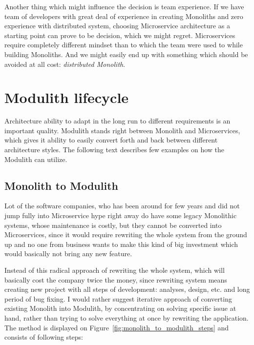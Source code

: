 Another thing which might influence the decision is team experience. If we have team of developers with great deal of experience in creating Monoliths and zero experience with distributed system, choosing Microservice architecture as a starting point can prove to be decision, which we might regret. Microservices require completely different mindset than to which the team were used to while building Monoliths. And we might easily end up with something which should be avoided at all cost: \textit{distributed Monolith}.

\section{Modulith lifecycle}
Architecture ability to adapt in the long run to different requirements is an important quality. Modulith stands right between Monolith and Microservices, which gives it ability to easily convert forth and back between different architecture styles. The following text describes few examples on how the Modulith can utilize.

\subsection{Monolith to Modulith}
\label{subsection:monolith_to_modulith}
Lot of the software companies, who has been around for few years and did not jump fully into Microservice hype right away do have some legacy Monolithic systems, whose maintenance is costly, but they cannot be converted into Microservices, since it would require rewriting the whole system from the ground up and no one from business wants to make this kind of big investment which would basically not bring any new feature.

Instead of this radical approach of rewriting the whole system, which will basically cost the company twice the money, since rewriting system means creating new project with all steps of development: analyses, design, etc. and long period of bug fixing. I would rather suggest iterative approach of converting existing Monolith into Modulith, by concentrating on solving specific issue at hand, rather than trying to solve everything at once by rewriting the application. The method is displayed on Figure~\ref{fig:monolith_to_modulith_steps} and consists of following steps:

